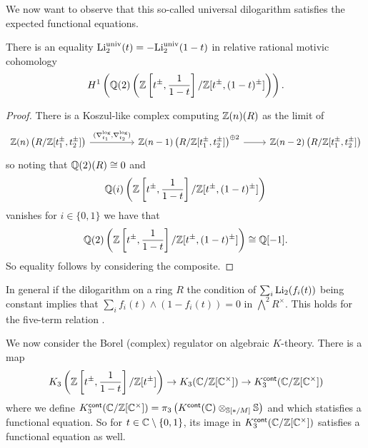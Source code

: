 We now want to observe that this so-called universal dilogarithm satisfies the expected functional equations. 
\begin{proposition}\label{prop: equality of the universal dilogarithm}
    There is an equality $\mathrm{Li}_{2}^{\mathrm{univ}}(t)=-\mathrm{Li}_{2}^{\mathrm{univ}}(1-t)$ in relative rational motivic cohomology 
    $$H^{1}\left(\mathbb{Q}(2)\left(\mathbb{Z}\left[t^{\pm},\frac{1}{1-t}\right]/\mathbb{Z}[t^{\pm}, (1-t)^{\pm}]\right)\right).$$ 
\end{proposition}
\begin{proof}
    There is a Koszul-like complex computing $\mathbb{Z}(n)(R)$ as the limit of 
    $$%
    \begin{tikzcd}
        {\ZZ(n)\left(R/\ZZ[t_{1}^{\pm},t_{2}^{\pm}]\right)} && {\ZZ(n-1)\left(R/\ZZ[t_{1}^{\pm},t_{2}^{\pm}]\right)^{\oplus 2}} & {\ZZ(n-2)\left(R/\ZZ[t_{1}^{\pm},t_{2}^{\pm}]\right)}
        \arrow["{(\nabla_{t_{1}}^{\log},\nabla_{t_{2}}^{\log})}", from=1-1, to=1-3]
        \arrow[from=1-3, to=1-4]
    \end{tikzcd}$$
    so noting that $\mathbb{Q}(2)(R)\cong 0$ and 
    $$\mathbb{Q}(i)\left(\mathbb{Z}\left[t^{\pm},\frac{1}{1-t}\right]/\mathbb{Z}[t^{\pm}, (1-t)^{\pm}]\right)$$
    vanishes for $i\in\{0,1\}$ we have that 
    $$\mathbb{Q}(2)\left(\mathbb{Z}\left[t^{\pm},\frac{1}{1-t}\right]/\mathbb{Z}[t^{\pm}, (1-t)^{\pm}]\right)\cong\mathbb{Q}[-1].$$
    So equality follows by considering the composite. 
\end{proof}
\begin{remark}
    In general if the dilogarithm on a ring $R$ the condition of $\sum_{i}\mathrm{Li}_{2}(f_{i}(t))$ being constant implies that $\sum_{i}f_{i}(t)\wedge (1-f_{i}(t))=0$ in $\bigwedge^{2}R^{\times}$. This holds for the five-term relation . 
\end{remark}
We now consider the Borel (complex) regulator on algebraic $K$-theory. There is a map 
$$K_{3}\left(\mathbb{Z}\left[t^{\pm},\frac{1}{1-t}\right]/\mathbb{Z}[t^{\pm}]\right)\to K_{3}(\mathbb{C}/\mathbb{Z}[\mathbb{C}^{\times}])\to K_{3}^{\mathsf{cont}}(\mathbb{C}/\mathbb{Z}[\mathbb{C}^{\times}])$$
where we define $K_{3}^{\mathsf{cont}}(\mathbb{C}/\mathbb{Z}[\mathbb{C}^{\times}])=\pi_{3}\left(K^{\mathsf{cont}}(\mathbb{C})\otimes_{\mathbb{S}[*/M]}\mathbb{S}\right)$ and which statisfies a functional equation. So for $t\in\mathbb{C}\setminus\{0,1\}$, its image in $K_{3}^{\mathsf{cont}}(\mathbb{C}/\mathbb{Z}[\mathbb{C}^{\times}])$ satisfies a functional equation as well. 

